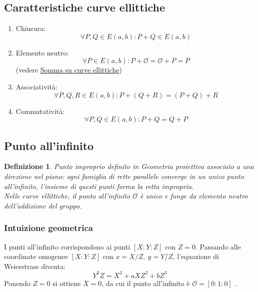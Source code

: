 \documentclass[12pt, a4paper]{report}
\newtheorem{definition}{Definizione}[section]
\begin{document}
\subsection{Caratteristiche curve ellittiche}
\begin{enumerate}
    \item Chiusura: \begin{equation}
        \forall P, Q \in E(a, b): P + Q \in E(a, b)
    \end{equation}
    \item Elemento neutro: \begin{equation}
        \forall P \in E(a, b): P + \mathcal{O} = \mathcal{O} + P = P
    \end{equation} (vedere \hyperref[sec:Somma]{Somma su curve ellittiche})
    \item Associatività:
    \begin{equation}
        \forall P, Q, R \in E(a, b): P + (Q + R) = (P + Q) + R
    \end{equation}
    \item Commutatività:
    \begin{equation}
        \forall P, Q \in E(a, b): P + Q = Q + P
    \end{equation}
\end{enumerate}

\subsection{Punto all'infinito}
\label{sec:punto-infinito}
\begin{definition}
    Punto improprio definito in Geometria proiettiva associato a una direzione nel piano: ogni famiglia di rette parallele converge in un unico punto all'infinito, l'insieme di questi punti forma la \emph{retta impropria}.\\
    Nelle curve ellittiche, il punto all'infinito $\mathcal{O}$ è unico e funge da elemento neutro dell'addizione del gruppo.
\end{definition}
\subsubsection*{Intuizione geometrica}
    I punti all'infinito corrispondono ai punti $[X:Y:Z]$ con $Z = 0$.
    Passando alle coordinate omogenee $[X:Y:Z]$ con $x = X/Z,\ y = Y/Z$, l'equazione di Weierstrass diventa:
    \begin{equation}
        Y^2Z = X^3 + aXZ^2 + bZ^3
    \end{equation}
Ponendo $Z = 0$ si ottiene $X = 0$, da cui il punto all'infinito è 
$\mathcal{O} = [0:1:0]$ \cite{silverman}.
\end{document}
